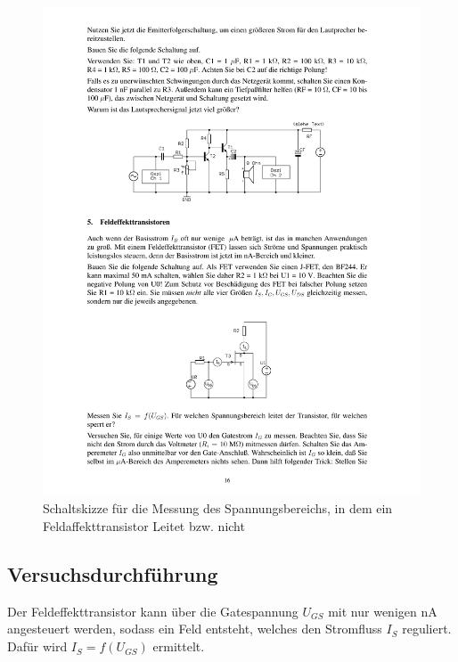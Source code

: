 \documentclass[12pt,a4paper]{article}
\begin{document}
\begin{figure}[H] 
  \centering
    \includegraphics[trim = 10mm 50mm 10mm 174mm, clip, scale = 1]{ep3_14[Page16].pdf}
  	\caption[Schaltskizze für die Messung des Spannungsbereichs, in dem ein Feldaffekttransistor Leitet bzw. nicht]{Schaltskizze für die Messung des Spannungsbereichs, in dem ein Feldaffekttransistor Leitet bzw. nicht\footnotemark}
  \label{fig:7}
\end{figure}

\subsection{Versuchsdurchführung}
Der Feldeffekttransistor kann über die Gatespannung $U_{GS}$ mit nur wenigen \unit{nA} angesteuert werden, sodass ein Feld entsteht, welches den Stromfluss $I_S$ reguliert. Dafür wird $I_S = f(U_{GS})$ ermittelt.
\end{document}

